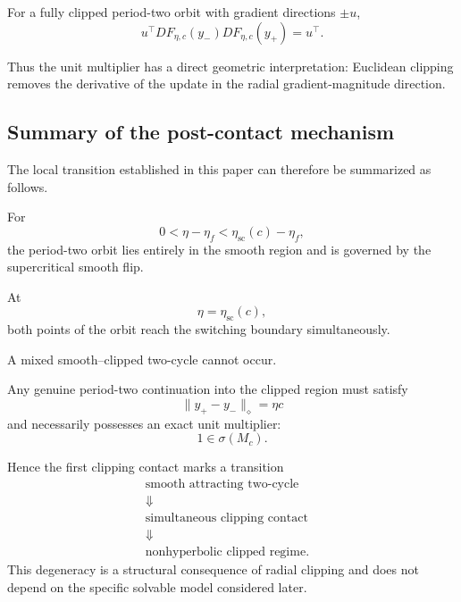 For a fully clipped period-two orbit with gradient directions
$\pm u$,
\begin{equation}
u^\top
DF_{\eta,c}(y_-)
DF_{\eta,c}(y_+)
=
u^\top.
\label{eq:euclidean-two-step-neutral}
\end{equation}

Thus the unit multiplier has a direct geometric interpretation:
Euclidean clipping removes the derivative of the update in the
radial gradient-magnitude direction.

\subsection{Summary of the post-contact mechanism}
\label{subsec:postcontact-summary-main}

The local transition established in this paper can therefore be
summarized as follows.

For
\[
0<
\eta-\eta_f
<
\eta_{\mathrm{sc}}(c)-\eta_f,
\]
the period-two orbit lies entirely in the smooth region and is
governed by the supercritical smooth flip.

At
\[
\eta
=
\eta_{\mathrm{sc}}(c),
\]
both points of the orbit reach the switching boundary simultaneously.

A mixed smooth--clipped two-cycle cannot occur.

Any genuine period-two continuation into the clipped region must
satisfy
\[
\|y_+-y_-\|_\diamond
=
\eta c
\]
and necessarily possesses an exact unit multiplier:
\[
1
\in
\sigma(M_c).
\]

Hence the first clipping contact marks a transition
\begin{equation}
\begin{aligned}
\text{smooth attracting two-cycle}
&\\[-1mm]
\Downarrow
&\\[-1mm]
\text{simultaneous clipping contact}
&\\[-1mm]
\Downarrow
&\\[-1mm]
\text{nonhyperbolic clipped regime}.
\end{aligned}
\end{equation}
This degeneracy is a structural consequence of radial clipping and
does not depend on the specific solvable model considered later.
